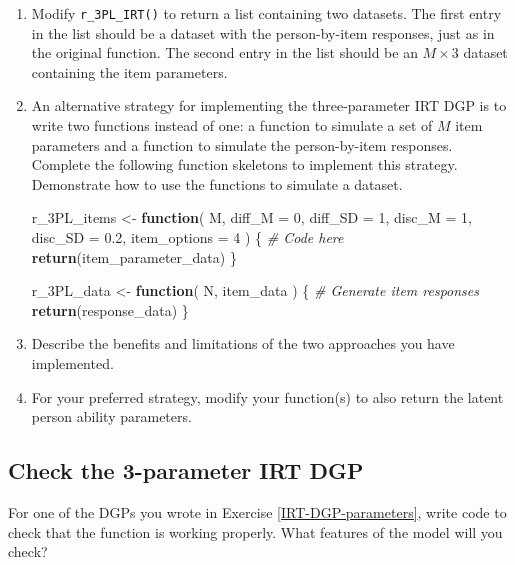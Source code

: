 \documentclass[
]{book}
\newenvironment{Shaded}{\begin{snugshade}}{\end{snugshade}}
\newcommand{\AttributeTok}[1]{\textcolor[rgb]{0.13,0.29,0.53}{#1}}
\newcommand{\CommentTok}[1]{\textcolor[rgb]{0.56,0.35,0.01}{\textit{#1}}}
\newcommand{\ControlFlowTok}[1]{\textcolor[rgb]{0.13,0.29,0.53}{\textbf{#1}}}
\newcommand{\DecValTok}[1]{\textcolor[rgb]{0.00,0.00,0.81}{#1}}
\newcommand{\FloatTok}[1]{\textcolor[rgb]{0.00,0.00,0.81}{#1}}
\newcommand{\FunctionTok}[1]{\textcolor[rgb]{0.13,0.29,0.53}{\textbf{#1}}}
\newcommand{\NormalTok}[1]{#1}
\newcommand{\OtherTok}[1]{\textcolor[rgb]{0.56,0.35,0.01}{#1}}
\begin{document}
\begin{enumerate}
\def\labelenumi{\arabic{enumi}.}
\item
  Modify \texttt{r\_3PL\_IRT()} to return a list containing two datasets. The first entry in the list should be a dataset with the person-by-item responses, just as in the original function. The second entry in the list should be an \(M \times 3\) dataset containing the item parameters.
\item
  An alternative strategy for implementing the three-parameter IRT DGP is to write two functions instead of one: a function to simulate a set of \(M\) item parameters and a function to simulate the person-by-item responses. Complete the following function skeletons to implement this strategy. Demonstrate how to use the functions to simulate a dataset.

\begin{Shaded}
\begin{Highlighting}[]
\NormalTok{r\_3PL\_items }\OtherTok{\textless{}{-}} \ControlFlowTok{function}\NormalTok{(}
\NormalTok{  M, }
  \AttributeTok{diff\_M =} \DecValTok{0}\NormalTok{, }\AttributeTok{diff\_SD =} \DecValTok{1}\NormalTok{,}
  \AttributeTok{disc\_M =} \DecValTok{1}\NormalTok{, }\AttributeTok{disc\_SD =} \FloatTok{0.2}\NormalTok{,}
  \AttributeTok{item\_options =} \DecValTok{4}
\NormalTok{) \{}
  \CommentTok{\# Code here}
  \FunctionTok{return}\NormalTok{(item\_parameter\_data)}
\NormalTok{\}}

\NormalTok{r\_3PL\_data }\OtherTok{\textless{}{-}} \ControlFlowTok{function}\NormalTok{( N, item\_data ) \{}
  \CommentTok{\# Generate item responses}
  \FunctionTok{return}\NormalTok{(response\_data)}
\NormalTok{\}}
\end{Highlighting}
\end{Shaded}
\item
  Describe the benefits and limitations of the two approaches you have implemented.
\item
  For your preferred strategy, modify your function(s) to also return the latent person ability parameters.
\end{enumerate}

\subsection{Check the 3-parameter IRT DGP}\label{IRT-DGP-checking}

For one of the DGPs you wrote in Exercise \ref{IRT-DGP-parameters}, write code to check that the function is working properly. What features of the model will you check?
\end{document}
